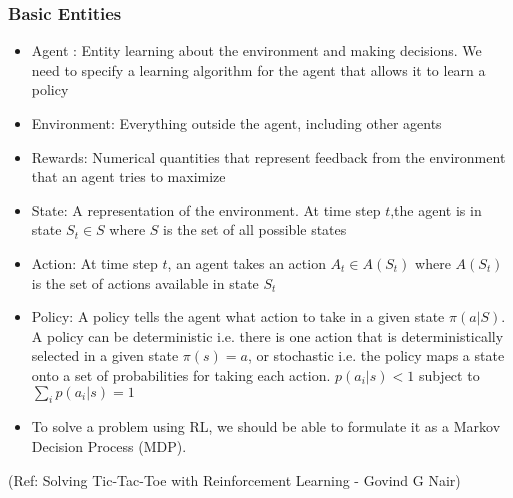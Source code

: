 \begin{frame}[fragile]\frametitle{Basic Entities}


\begin{itemize}
\item Agent : Entity learning about the environment and making decisions. We need to specify a learning algorithm for the agent that allows it to learn a policy
\item Environment: Everything outside the agent, including other agents
\item Rewards: Numerical quantities that represent feedback from the environment that an agent tries to maximize
\item State: A representation of the environment. At time step $t$,the agent is in state $S_t \in S$ where $S$ is the set of all possible states
\item Action: At time step $t$, an agent takes an action $A_t \in A(S_t)$ where $A(S_t)$ is the set of actions available in state $S_t$
\item Policy: A policy tells the agent what action to take in a given state $\pi(a|S)$. A policy can be deterministic i.e. there is one action that is deterministically selected in a given state $\pi(s)=a$, or stochastic i.e. the policy maps a state onto a set of probabilities for taking each action. $p(a_i|s) < 1$ subject to $\sum_{i} p(a_i|s) = 1$
\item To solve a problem using RL, we should be able to formulate it as a Markov Decision Process (MDP).
\end{itemize}



{\tiny (Ref: Solving Tic-Tac-Toe with Reinforcement Learning - Govind G Nair)}

\end{frame}

